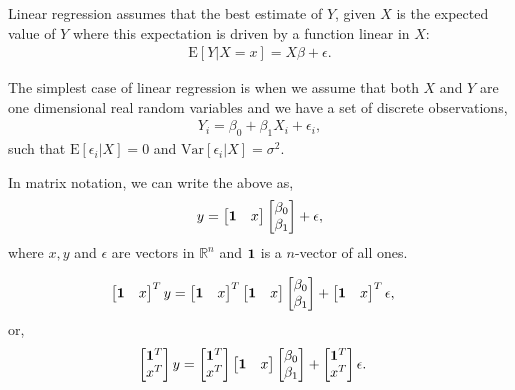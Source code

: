 \documentclass{amsart}
\theoremstyle{plain}
\numberwithin{equation}{section}
\begin{document}
Linear regression assumes that the best estimate 
of $Y$, given $X$ is the expected value of $Y$ where this 
expectation is driven by a function linear in $X$:
\begin{align*}
\mathrm{E}[Y|X=x] = X\beta + \epsilon.
\end{align*}

The simplest case of linear regression is when 
we assume that both $X$ and $Y$ are one dimensional
real random variables and we have a set of 
discrete observations,
\begin{align*}
Y_i = \beta_0 + \beta_1 X_i + \epsilon_i,
\end{align*}
such that $\mathrm{E}[\epsilon_i|X] = 0$ and 
$\mathrm{Var}[\epsilon_i|X] = \sigma^2$.

In matrix notation, we can write the above as,
\begin{align*}
y = \begin{bmatrix}
{\bf 1} & x
\end{bmatrix}
\begin{bmatrix}
\beta_0\\
\beta_1
\end{bmatrix} + \epsilon,
\end{align*}
where $x, y$ and $\epsilon$ are vectors in $\mathbb{R}^n$ and 
${\bf 1}$ is a $n$-vector of all ones.

\begin{align*}
\begin{bmatrix}
{\bf 1} & x
\end{bmatrix}^T
y &= 
\begin{bmatrix}
{\bf 1} & x
\end{bmatrix}^T
\begin{bmatrix}
{\bf 1} & x
\end{bmatrix}
\begin{bmatrix}
\beta_0\\
\beta_1
\end{bmatrix} + 
\begin{bmatrix}
{\bf 1} & x
\end{bmatrix}^T\epsilon,
\end{align*}
or,
\begin{align*}
\begin{bmatrix}
{\bf 1}^T\\
x^T
\end{bmatrix}
y &= 
\begin{bmatrix}
{\bf 1}^T\\
x^T
\end{bmatrix}
\begin{bmatrix}
{\bf 1} & x
\end{bmatrix}
\begin{bmatrix}
\beta_0\\
\beta_1
\end{bmatrix} + 
\begin{bmatrix}
{\bf 1}^T\\
x^T
\end{bmatrix}\epsilon.
\end{align*}
\end{document}
